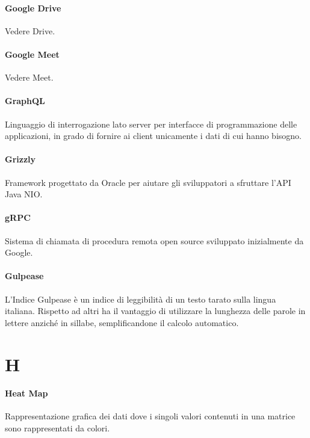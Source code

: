 \documentclass[]{article}
\begin{document}
    \paragraph*{Google Drive}
    Vedere Drive.

    \paragraph*{Google Meet}
    Vedere Meet.

	\paragraph*{GraphQL}
	Linguaggio di interrogazione lato server per interfacce di programmazione delle applicazioni, in grado di fornire ai client unicamente i dati di cui hanno bisogno.

	\paragraph*{Grizzly}
	Framework progettato da Oracle per aiutare gli sviluppatori a sfruttare l'API Java NIO.

	\paragraph*{gRPC}
	Sistema di chiamata di procedura remota open source sviluppato inizialmente da Google.

	\paragraph*{Gulpease}
	L'Indice Gulpease è un indice di leggibilità di un testo tarato sulla lingua italiana. Rispetto ad altri ha il vantaggio di utilizzare la lunghezza delle parole in lettere anziché in sillabe, semplificandone il calcolo automatico.

	\newpage

	\section*{H}

	\paragraph*{Heat Map}
	Rappresentazione grafica dei dati dove i singoli valori contenuti in una matrice sono rappresentati da colori.
\end{document}
